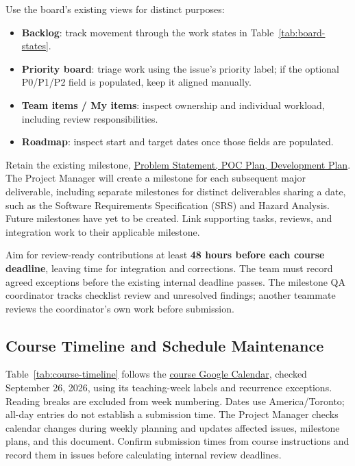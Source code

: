 \documentclass{article}
\begin{document}
Use the board's existing views for distinct purposes:
\begin{itemize}
  \item \textbf{Backlog}: track movement through the work states in
  Table~\ref{tab:board-states}.
  \item \textbf{Priority board}: triage work using the issue's priority label;
  if the optional P0/P1/P2 field is populated, keep it aligned manually.
  \item \textbf{Team items / My items}: inspect ownership and individual
  workload, including review responsibilities.
  \item \textbf{Roadmap}: inspect start and target dates once those fields
  are populated.
\end{itemize}

Retain the existing milestone,
\href{https://github.com/AHMEDELZARIA/squigglr/milestone/1}
{Problem Statement, POC Plan, Development Plan}. The Project Manager will
create a milestone for each subsequent major deliverable, including separate
milestones for distinct deliverables sharing a date, such as the Software
Requirements Specification (SRS) and Hazard Analysis. Future milestones have
yet to be created. Link supporting tasks, reviews, and integration work to
their applicable milestone.

Aim for review-ready contributions at least \textbf{48 hours before each
course deadline}, leaving time for integration and corrections. The team
must record agreed exceptions before the existing internal deadline passes.
The milestone QA coordinator tracks checklist review and unresolved findings;
another teammate reviews the coordinator's own work before submission.

\subsection{Course Timeline and Schedule Maintenance}

Table~\ref{tab:course-timeline} follows the
\href{https://calendar.google.com/calendar/u/0/embed?src=rnboqiaki1k2la7rpu3bn0um58@group.calendar.google.com&ctz=America/Toronto}
{course Google Calendar}, checked September 26, 2026, using its teaching-week
labels and recurrence exceptions. Reading breaks are excluded from week
numbering. Dates use America/Toronto; all-day entries do not establish a
submission time. The Project Manager checks calendar changes during weekly
planning and updates affected issues, milestone plans, and this document.
Confirm submission times from course instructions and record them in issues
before calculating internal review deadlines.
\end{document}
